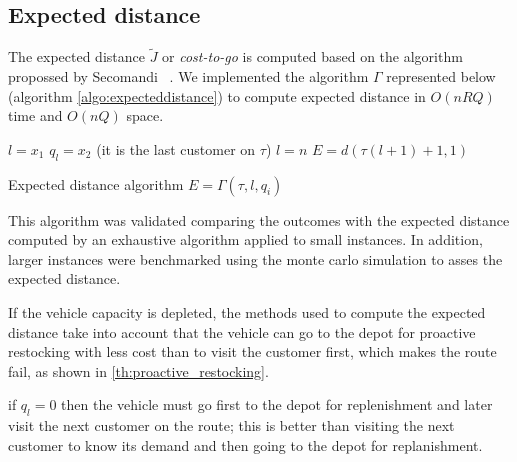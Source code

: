\subsection{Expected distance}\label{sec:expecteddistance}

The expected distance $\tilde{J}$ or \textit{cost-to-go} is computed based on the algorithm propossed by Secomandi ~\cite{secomandi_rollout_2001}. We implemented the algorithm $\Gamma$ represented below (algorithm \ref{algo:expecteddistance}) to compute expected distance in $O(nRQ)$ time and $O(nQ)$ space.

\begin{algorithm}
$l = x_1$\;
$q_l = x_2$\;
\If(it is the last customer on $\tau$){ $l = n$ }{%
  $E = d(\tau(l+1)+1,1)$\;%
}

\caption{Expected distance algorithm $E = \Gamma(\tau,l,q_i)$}\label{algo:expecteddistance}
\end{algorithm}

This algorithm was validated comparing the outcomes with the expected distance computed by an exhaustive algorithm applied to small instances. In addition, larger instances were benchmarked using the monte carlo simulation to asses the expected distance.

If the vehicle capacity is depleted, the methods used to compute the expected distance take into account that the vehicle can go to the depot for proactive restocking with less cost than to visit the customer first, which makes the route fail, as shown in \ref{th:proactive_restocking}.

\begin{theorem}\label{th:proactive_restocking}%
 if $q_l=0$ then the vehicle must go first to the depot for replenishment and later visit the next customer on the route; this is better than visiting the next customer to know its demand and then going to the depot for replanishment.
\end{theorem}

